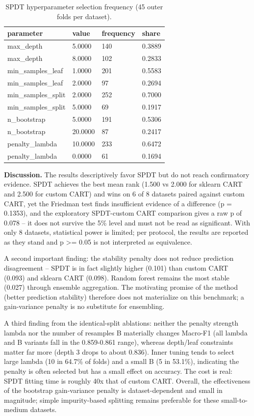 \documentclass[
  conference]{IEEEtran}
\begin{document}
\begin{table}[!tb]
\centering
\caption{SPDT hyperparameter selection frequency (45 outer folds per dataset).}
\begin{tabular}{@{}llll@{}}
\toprule\noalign{}
parameter & value & frequency & share \\
\midrule\noalign{}
\bottomrule\noalign{}
max\_depth & 5.0000 & 140 & 0.3889 \\
max\_depth & 8.0000 & 102 & 0.2833 \\
min\_samples\_leaf & 1.0000 & 201 & 0.5583 \\
min\_samples\_leaf & 2.0000 & 97 & 0.2694 \\
min\_samples\_split & 2.0000 & 252 & 0.7000 \\
min\_samples\_split & 5.0000 & 69 & 0.1917 \\
n\_bootstrap & 5.0000 & 191 & 0.5306 \\
n\_bootstrap & 20.0000 & 87 & 0.2417 \\
penalty\_lambda & 10.0000 & 233 & 0.6472 \\
penalty\_lambda & 0.0000 & 61 & 0.1694 \\
\end{tabular}
\end{table}

\textbf{Discussion.} The results descriptively favor SPDT but do not
reach confirmatory evidence. SPDT achieves the best mean rank (1.500 vs
2.000 for sklearn CART and 2.500 for custom CART) and wins on 6 of 8
datasets paired against custom CART, yet the Friedman test finds
insufficient evidence of a difference (p = 0.1353), and the exploratory
SPDT-custom CART comparison gives a raw p of 0.078 -- it does not
survive the 5\% level and must not be read as significant. With only 8
datasets, statistical power is limited; per protocol, the results are
reported as they stand and p \textgreater= 0.05 is not interpreted as
equivalence.

A second important finding: the stability penalty does not reduce
prediction disagreement -- SPDT is in fact slightly higher (0.101) than
custom CART (0.093) and sklearn CART (0.098). Random forest remains the
most stable (0.027) through ensemble aggregation. The motivating promise
of the method (better prediction stability) therefore does not
materialize on this benchmark; a gain-variance penalty is no substitute
for ensembling.

A third finding from the identical-split ablations: neither the penalty
strength lambda nor the number of resamples B materially changes
Macro-F1 (all lambda and B variants fall in the 0.859-0.861 range),
whereas depth/leaf constraints matter far more (depth 3 drops to about
0.836). Inner tuning tends to select large lambda (10 in 64.7\% of
folds) and a small B (5 in 53.1\%), indicating the penalty is often
selected but has a small effect on accuracy. The cost is real: SPDT
fitting time is roughly 40x that of custom CART. Overall, the
effectiveness of the bootstrap gain-variance penalty is
dataset-dependent and small in magnitude; simple impurity-based
splitting remains preferable for these small-to-medium datasets.
\end{document}
